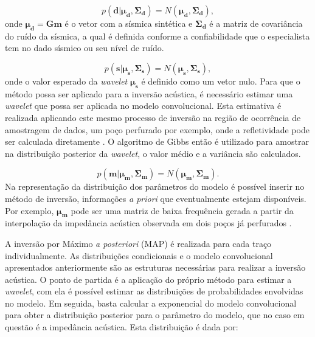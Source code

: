 \begin{equation}
\label{eq:psismico}
p(\boldsymbol{d}|\boldsymbol{\mu_{d}},\boldsymbol{\Sigma_{d}}) =
N(\boldsymbol{\mu_{d}},\boldsymbol{\Sigma_{d}}),
\end{equation}
onde $\boldsymbol{\mu_{d}} = \boldsymbol{Gm}$ é o vetor com a sísmica
sintética e $\boldsymbol{\Sigma_{d}}$ é a matriz de covariância do ruído da
sísmica, a qual é definida conforme a confiabilidade que o especialista tem no
dado sísmico ou seu nível de ruído.

\begin{equation}
\label{eq:pwavelet}
p(\boldsymbol{s}|\boldsymbol{\mu_{s}},\boldsymbol{\Sigma_{s}}) =
N(\boldsymbol{\mu_{s}},\boldsymbol{\Sigma_{s}}),
\end{equation} 
onde o valor esperado da \textit{wavelet} $\boldsymbol{\mu_{s}}$ é definido
como um vetor nulo. Para que o método possa ser aplicado para a inversão
acústica, é necessário estimar uma \textit{wavelet} que possa ser aplicada
no modelo convolucional. Esta estimativa é realizada aplicando este mesmo processo
de inversão na região de ocorrência de amostragem de dados, um poço perfurado por exemplo, onde a refletividade pode
ser calculada diretamente \citep{leandroGRSL}. O algoritmo de
Gibbs então é utilizado para amostrar na distribuição posterior da \textit{wavelet}, 
o valor médio e a variância são calculados.

\begin{equation}
\label{eq:pmodelo}
p(\boldsymbol{m}|\boldsymbol{\mu_{m}},\boldsymbol{\Sigma_{m}}) =
N(\boldsymbol{\mu_{m}},\boldsymbol{\Sigma_{m}}).
\end{equation} 
Na representação da distribuição dos parâmetros do modelo é possível inserir no método de inversão, informações \textit{a priori}
que eventualmente estejam disponíveis. Por exemplo, $\boldsymbol{\mu_{m}}$ pode ser
uma matriz de baixa frequência gerada a partir da interpolação da impedância acústica observada em dois poços
já perfurados \citep{leandroGRSL}.

A inversão por Máximo \textit{a posteriori} (MAP)
\citep{Buland01012003,leandroGRSL} é realizada para cada traço individualmente.
As distribuições condicionais e o modelo convolucional apresentados anteriormente
são as estruturas necessárias para realizar a inversão acústica. O ponto de partida
é a aplicação do próprio método para estimar a \textit{wavelet},
com ela é possível estimar as distribuições de probabilidades envolvidas no modelo.
Em seguida, basta calcular a exponencial do modelo convolucional para obter a distribuição posterior
para o parâmetro do modelo, que no caso em questão é a impedância acústica. Esta distribuição é dada por:

